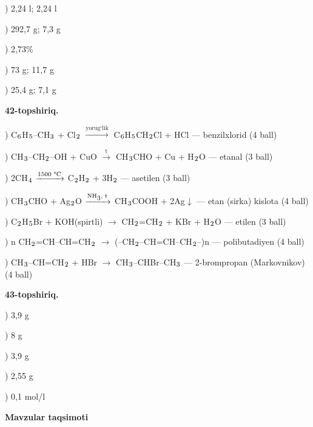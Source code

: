 \documentclass[11pt,a4paper]{article}
\renewcommand{\textsubscript}[1]{\ensuremath{_{\text{\fontsize{8}{8}\selectfont #1}}}}
\begin{document}
) 2,24 l; 2,24 l\par
{}) 292,7 g; 7,3 g\par
{}) 2,73\%\par
{}) 73 g; 11,7 g\par
{}) 25,4 g; 7,1 g\par
\noindent\textbf{42-topshiriq.}\par
{}) C\textsubscript{6}H\textsubscript{5}--CH\textsubscript{3} + Cl\textsubscript{2} $\xrightarrow{\text{yorug`lik}}$ C\textsubscript{6}H\textsubscript{5}CH\textsubscript{2}Cl + HCl --- benzilxlorid (4 ball)\par
{}) CH\textsubscript{3}--CH\textsubscript{2}--OH + CuO $\xrightarrow{\text{t}}$ CH\textsubscript{3}CHO + Cu + H\textsubscript{2}O --- etanal (3 ball)\par
{}) 2CH\textsubscript{4} $\xrightarrow{\text{1500 \textdegree{}C}}$ C\textsubscript{2}H\textsubscript{2} + 3H\textsubscript{2} --- asetilen (3 ball)\par
{}) CH\textsubscript{3}CHO + Ag\textsubscript{2}O $\xrightarrow{\text{NH\textsubscript{3}, t}}$ CH\textsubscript{3}COOH + 2Ag$\downarrow$ --- etan (sirka) kislota (4 ball)\par
{}) C\textsubscript{2}H\textsubscript{5}Br + KOH(spirtli) $\to$ CH\textsubscript{2}=CH\textsubscript{2} + KBr + H\textsubscript{2}O --- etilen (3 ball)\par
{}) n CH\textsubscript{2}=CH--CH=CH\textsubscript{2} $\to$ (--CH\textsubscript{2}--CH=CH--CH\textsubscript{2}--)n --- polibutadiyen (4 ball)\par
{}) CH\textsubscript{3}--CH=CH\textsubscript{2} + HBr $\to$ CH\textsubscript{3}--CHBr--CH\textsubscript{3} --- 2-brompropan (Markovnikov) (4 ball)\par
\noindent\textbf{43-topshiriq.}\par
{}) 3,9 g\par
{}) 8 g\par
{}) 3,9 g\par
{}) 2,55 g\par
{}) 0,1 mol/l\par
\par\bigskip\noindent\textbf{Mavzular taqsimoti}\par\smallskip
\end{document}
